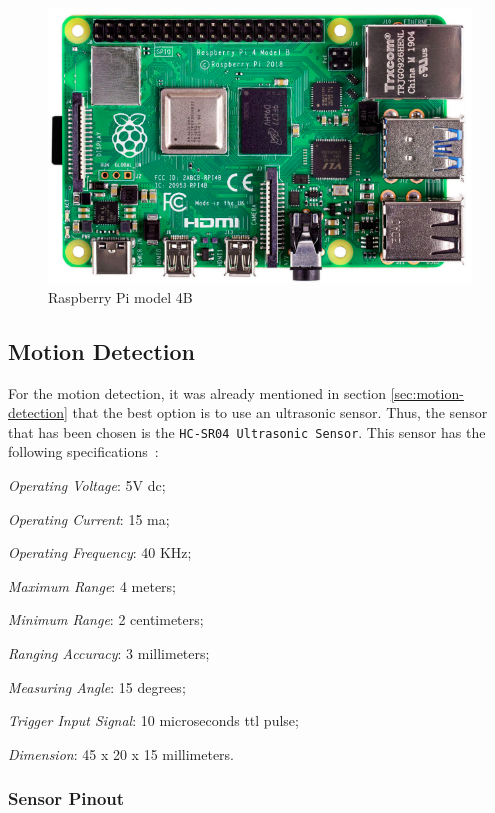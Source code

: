 %
\begin{figure}[htb!]
\centering
    \includegraphics[width=0.6\columnwidth]{./img/raspberry.png}
  \caption{Raspberry Pi model 4B}%
\label{fig:raspberri}
\end{figure}

\subsection{Motion Detection}
\label{sec:motion-detec}

For the motion detection, it was already mentioned in section \ref{sec:motion-detection} that the best option is to use an ultrasonic sensor. Thus, the sensor that has been chosen is the \texttt{HC-SR04 Ultrasonic Sensor}. This sensor has the following specifications~\cite{sensor}:
%
\begin{item-c}
\item \emph{Operating Voltage}: 5V \gls{dc};
\item \emph{Operating Current}: 15 \gls{ma};
\item \emph{Operating Frequency}: 40 KHz;
\item \emph{Maximum Range}: 4 meters;
\item \emph{Minimum Range}: 2 centimeters;
\item \emph{Ranging Accuracy}: 3 millimeters;
\item \emph{Measuring Angle}: 15 degrees;
\item \emph{Trigger Input Signal}: 10 microseconds \gls{ttl} pulse;
\item \emph{Dimension}: 45 x 20 x 15 millimeters.
\end{item-c}

\subsubsection{Sensor Pinout}


